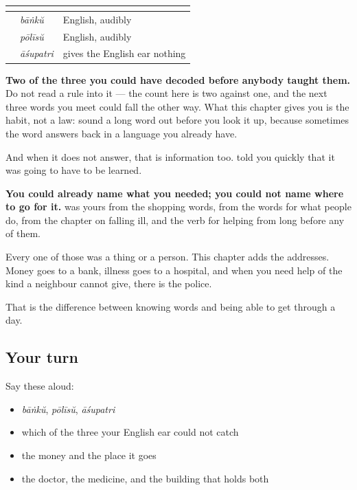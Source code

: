 \begin{grammarlens}[title={Grammar Lens: two your ear could read, one it could not}]
\noindent
\begin{tabularx}{\linewidth}{@{}>{\raggedright\arraybackslash}X>{\raggedright\arraybackslash}X>{\raggedright\arraybackslash}X@{}}
\toprule
\textbf{} & \textbf{} & \textbf{} \\
\midrule
\textbf{\ml{ബാങ്ക്}} & \emph{bāṅkŭ} & English, audibly \\
\textbf{\ml{പോലീസ്}} & \emph{pōlīsŭ} & English, audibly \\
\textbf{\ml{ആശുപത്രി}} & \emph{āśupatri} & gives the English ear nothing \\
\bottomrule
\end{tabularx}

\textbf{Two of the three you could have decoded before anybody taught them.} Do not read a rule into it — the count here is two against one, and the next three words you meet could fall the other way. What this chapter gives you is the habit, not a law: sound a long word out before you look it up, because sometimes the word answers back in a language you already have.

And when it does not answer, that is information too. \textbf{} told you quickly that it was going to have to be learned.
\end{grammarlens}

\begin{grammarlens}[title={What you've built}]
\textbf{You could already name what you needed; you could not name where to go for it.} \textbf{} was yours from the shopping words, \textbf{} from the words for what people do, \textbf{} from the chapter on falling ill, and the verb for helping from long before any of them.

Every one of those was a thing or a person. This chapter adds the addresses. Money goes to a bank, illness goes to a hospital, and when you need help of the kind a neighbour cannot give, there is the police.

That is the difference between knowing words and being able to get through a day.
\end{grammarlens}

\subsection*{Your turn}
Say these aloud:

\begin{itemize}
\raggedright
  \item \emph{bāṅkŭ}, \emph{pōlīsŭ}, \emph{āśupatri}
  \item which of the three your English ear could not catch
  \item the money and the place it goes
  \item the doctor, the medicine, and the building that holds both
\end{itemize}

